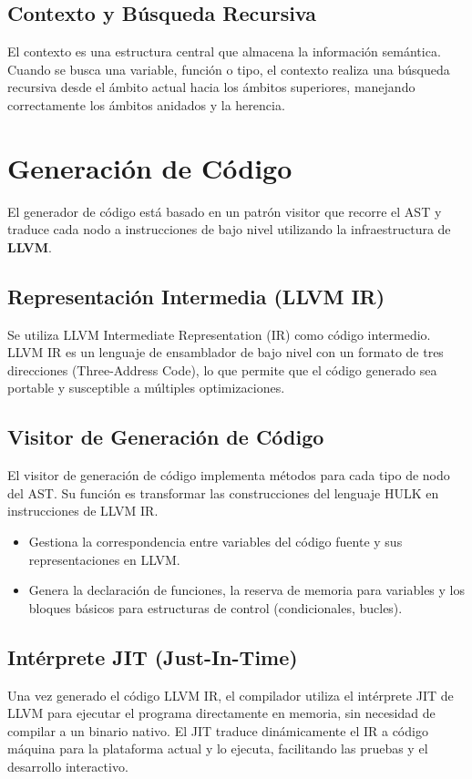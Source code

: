 \documentclass{article}
\begin{document}
    \subsection{Contexto y Búsqueda Recursiva}
    El contexto es una estructura central que almacena la información semántica. Cuando se busca una variable, función o tipo, el contexto realiza una búsqueda recursiva desde el ámbito actual hacia los ámbitos superiores, manejando correctamente los ámbitos anidados y la herencia.

\section{Generación de Código}
El generador de código está basado en un patrón visitor que recorre el AST y traduce cada nodo a instrucciones de bajo nivel utilizando la infraestructura de \textbf{LLVM}.
    \subsection{Representación Intermedia (LLVM IR)}
    Se utiliza LLVM Intermediate Representation (IR) como código intermedio. LLVM IR es un lenguaje de ensamblador de bajo nivel con un formato de tres direcciones (Three-Address Code), lo que permite que el código generado sea portable y susceptible a múltiples optimizaciones.
    \subsection{Visitor de Generación de Código}
    El visitor de generación de código implementa métodos para cada tipo de nodo del AST. Su función es transformar las construcciones del lenguaje HULK en instrucciones de LLVM IR.
    \begin{itemize}
        \item Gestiona la correspondencia entre variables del código fuente y sus representaciones en LLVM.
        \item Genera la declaración de funciones, la reserva de memoria para variables y los bloques básicos para estructuras de control (condicionales, bucles).
    \end{itemize}
    \subsection{Intérprete JIT (Just-In-Time)}
    Una vez generado el código LLVM IR, el compilador utiliza el intérprete JIT de LLVM para ejecutar el programa directamente en memoria, sin necesidad de compilar a un binario nativo. El JIT traduce dinámicamente el IR a código máquina para la plataforma actual y lo ejecuta, facilitando las pruebas y el desarrollo interactivo.
\end{document}

